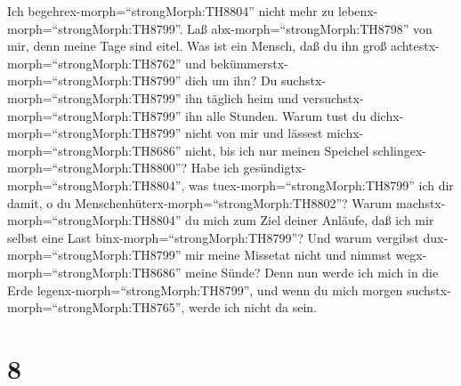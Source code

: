  Ich begehrex-morph=``strongMorph:TH8804'' nicht mehr zu
lebenx-morph=``strongMorph:TH8799''. Laß
abx-morph=``strongMorph:TH8798'' von mir, denn meine Tage sind eitel.
 Was ist ein Mensch, daß du ihn groß
achtestx-morph=``strongMorph:TH8762'' und
bekümmerstx-morph=``strongMorph:TH8799'' dich um ihn?  Du
suchstx-morph=``strongMorph:TH8799'' ihn täglich heim und
versuchstx-morph=``strongMorph:TH8799'' ihn alle Stunden. 
Warum tust du dichx-morph=``strongMorph:TH8799'' nicht von mir und
lässest michx-morph=``strongMorph:TH8686'' nicht, bis ich nur meinen
Speichel schlingex-morph=``strongMorph:TH8800''?  Habe ich
gesündigtx-morph=``strongMorph:TH8804'', was
tuex-morph=``strongMorph:TH8799'' ich dir damit, o du
Menschenhüterx-morph=``strongMorph:TH8802''? Warum
machstx-morph=``strongMorph:TH8804'' du mich zum Ziel deiner Anläufe,
daß ich mir selbst eine Last binx-morph=``strongMorph:TH8799''?
 Und warum vergibst dux-morph=``strongMorph:TH8799'' mir
meine Missetat nicht und nimmst wegx-morph=``strongMorph:TH8686'' meine
Sünde? Denn nun werde ich mich in die Erde
legenx-morph=``strongMorph:TH8799'', und wenn du mich morgen
suchstx-morph=``strongMorph:TH8765'', werde ich nicht da sein.

\hypertarget{section-7}{%
\section{8}\label{section-7}}

